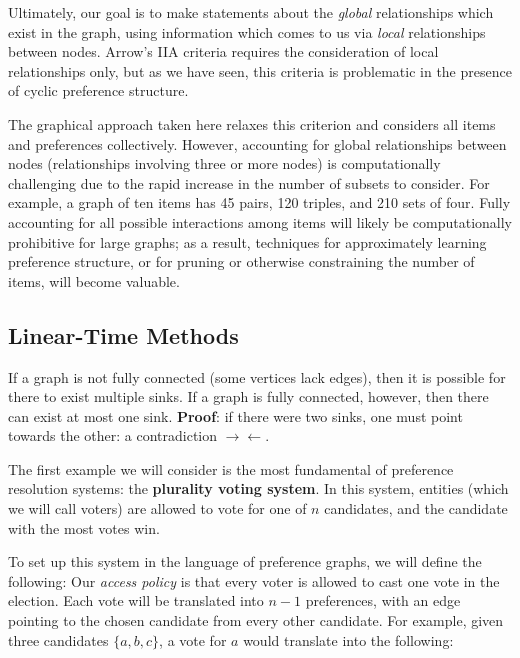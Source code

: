 
Ultimately, our goal is to make statements about the \textit{global} relationships which exist in the graph, using information which comes to us via \textit{local} relationships between nodes.
Arrow's IIA criteria requires the consideration of local relationships only, but as we have seen, this criteria is problematic in the presence of cyclic preference structure.

The graphical approach taken here relaxes this criterion and considers all items and preferences collectively.
However, accounting for global relationships between nodes (relationships involving three or more nodes) is computationally challenging due to the rapid increase in the number of subsets to consider.
For example, a graph of ten items has 45 pairs, 120 triples, and 210 sets of four.
Fully accounting for all possible interactions among items will likely be computationally prohibitive for large graphs; as a result, techniques for approximately learning preference structure, or for pruning or otherwise constraining the number of items, will become valuable.

\subsection{Linear-Time Methods}

If a graph is not fully connected (some vertices lack edges), then it is possible for there to exist multiple sinks.
If a graph is fully connected, however, then there can exist at most one sink. \textbf{Proof}: if there were two sinks, one must point towards the other: a contradiction $\rightarrow\leftarrow$.

The first example we will consider is the most fundamental of preference resolution systems: the \textbf{plurality voting system}.
In this system, entities (which we will call voters) are allowed to vote for one of $n$ candidates, and the candidate with the most votes win.

To set up this system in the language of preference graphs, we will define the following:
Our \textit{access policy} is that every voter is allowed to cast one vote in the election.
Each vote will be translated into $n-1$ preferences, with an edge pointing to the chosen candidate from every other candidate.
For example, given three candidates $\{a, b, c\}$, a vote for $a$ would translate into the following:

\begin{center}
	

	
\end{center}

